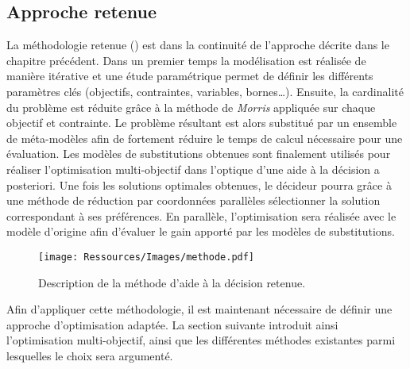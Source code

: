 \subsection{Approche retenue} %
\label{sub:approche_retenue_reduction}
La méthodologie retenue () est dans la continuité de
l’approche décrite dans le chapitre précédent.
Dans un premier temps la modélisation est réalisée de manière itérative et une étude
paramétrique permet de définir les différents paramètres clés (objectifs, contraintes,
variables, bornes\dots). Ensuite, la cardinalité du problème est réduite grâce à la
méthode de \textit{Morris} appliquée sur chaque objectif et contrainte. Le problème
résultant est alors substitué par un ensemble de méta-modèles afin de fortement réduire le
temps de calcul nécessaire pour une évaluation. Les modèles de substitutions obtenues
sont finalement utilisés pour réaliser l’optimisation multi-objectif dans l’optique
d’une aide à la décision a posteriori. Une fois les solutions optimales obtenues, le
décideur pourra grâce à une méthode de réduction par coordonnées parallèles sélectionner
la solution correspondant à ses préférences. En parallèle, l’optimisation sera réalisée
avec le modèle d’origine afin d’évaluer le gain apporté par les modèles de substitutions.

\begin{figure}
    \centering
    \texttt{[image: Ressources/Images/methode.pdf]}
    \caption{Description de la méthode d’aide à la décision retenue.}
    \label{fig:methode_aide_decision}
\end{figure}

Afin d’appliquer cette méthodologie, il est maintenant nécessaire de définir une approche
d’optimisation adaptée. La section suivante introduit ainsi l’optimisation multi-objectif,
ainsi que les différentes méthodes existantes parmi lesquelles le choix sera argumenté.





